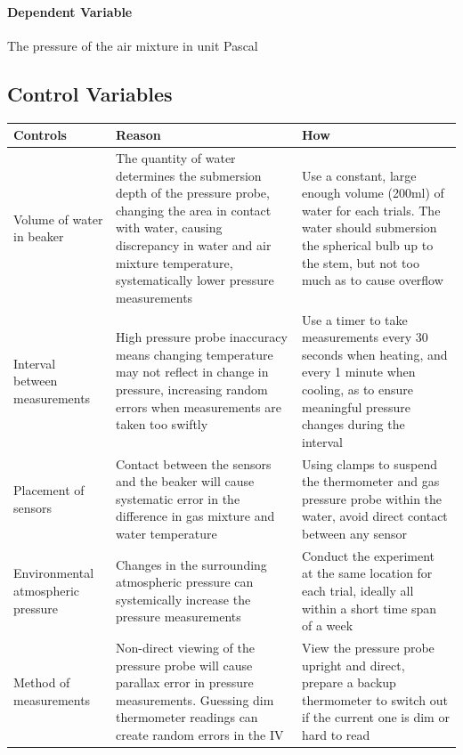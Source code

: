\documentclass[a4paper,12pt]{article}
\begin{document}
\paragraph{Dependent Variable}
The pressure of the air mixture in unit Pascal

\subsection{Control Variables}

\begin{longtable}{P{0.2\textwidth}|P{0.35\textwidth}|P{0.35\textwidth}}
Controls & Reason & How\\\hline

Volume of water in beaker & The quantity of water determines the submersion depth of the pressure probe, changing the area in contact with water, causing discrepancy in water and air mixture temperature, systematically lower pressure measurements & Use a constant, large enough volume (200ml) of water for each trials. The water should submersion the spherical bulb up to the stem, but not too much as to cause overflow \\

Interval between measurements & High pressure probe inaccuracy means changing temperature may not reflect in change in pressure, increasing random errors when measurements are taken too swiftly & Use a timer to take measurements every 30 seconds when heating, and every 1 minute when cooling, as to ensure meaningful pressure changes during the interval \\

Placement of sensors & Contact between the sensors and the beaker will cause systematic error in the difference in gas mixture and water temperature & Using clamps to suspend the thermometer and gas pressure probe within the water, avoid direct contact between any sensor \\

Environmental atmospheric pressure & Changes in the surrounding atmospheric pressure can systemically increase the pressure measurements & Conduct the experiment at the same location for each trial, ideally all within a short time span of a week
\\
Method of measurements & Non-direct viewing of the pressure probe will cause parallax error in pressure measurements. Guessing dim thermometer readings can create random errors in the IV & View the pressure probe upright and direct, prepare a backup thermometer to switch out if the current one is dim or hard to read \\
\end{longtable}
\end{document}
